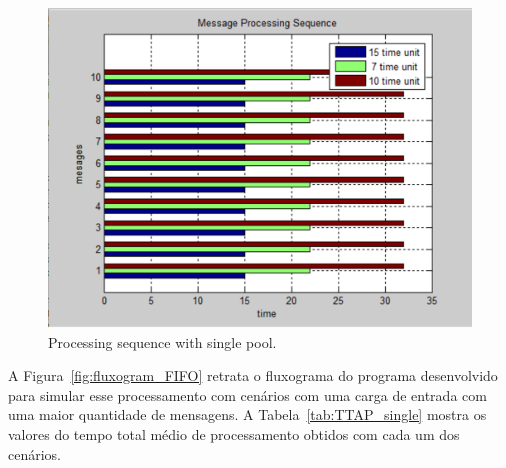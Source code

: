 \begin{figure}[h]
\centering
 \includegraphics[width=1\linewidth]{./figs/graphic_sequence_single.eps}
 \caption{Processing sequence with single pool.}
\label{fig:graphic_sequence_single}
\end{figure}
%
A Figura~\ref{fig:fluxogram_FIFO} retrata o fluxograma do programa desenvolvido para simular esse processamento com cenários com uma carga de entrada com uma maior quantidade de mensagens. A Tabela~\ref{tab:TTAP_single} mostra os valores do tempo total médio de processamento obtidos com cada um dos cenários.
